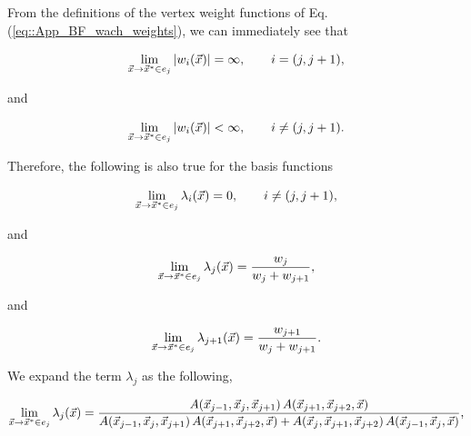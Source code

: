 \noindent From the definitions of the vertex weight functions of Eq. (\ref{eq::App_BF_wach_weights}), we can immediately see that 

\begin{equation}
\label{eq::App_BF_wach_edge_lim_jj1}
\lim\displaylimits_{\vec{x} \rightarrow \vec{x}^* \in e_j} | w_i (\vec{x}) |= \infty, \qquad i=(j,j+1) ,
\end{equation} 

\noindent and

\begin{equation}
\label{eq::App_BF_wach_edge_lim_others}
\lim\displaylimits_{\vec{x} \rightarrow \vec{x}^* \in e_j} |  w_i (\vec{x}) | < \infty, \qquad i\neq (j,j+1) .
\end{equation} 

\noindent Therefore, the following is also true for the basis functions

\begin{equation}
\label{eq::App_BF_wach_edge_lim_bfj}
\lim\displaylimits_{\vec{x} \rightarrow \vec{x}^* \in e_j}  \lambda_i (\vec{x}) = 0, \qquad i\neq(j,j+1),
\end{equation} 

\noindent and

\begin{equation}
\label{eq::App_BF_wach_edge_lim_bfj}
\lim\displaylimits_{\vec{x} \rightarrow \vec{x}^* \in e_j}  \lambda_{j} (\vec{x}) = \frac{w_j}{w_j + w_{j+1}}, 
\end{equation} 

\noindent and

\begin{equation}
\label{eq::App_BF_wach_edge_lim_bfj1}
\lim\displaylimits_{\vec{x} \rightarrow \vec{x}^* \in e_j}  \lambda_{j+1} (\vec{x}) = \frac{w_{j+1}}{w_j + w_{j+1}}.
\end{equation} 

\noindent We expand the term $\lambda_j$ as the following,

\begin{equation}
\label{eq::App_BF_wach_edge_lim_lamj_expand}
\lim\displaylimits_{\vec{x} \rightarrow \vec{x}^* \in e_j}  \lambda_{j} (\vec{x}) = \frac{A(\vec{x}_{j-1}, \vec{x}_{j}, \vec{x}_{j+1}) \, A(\vec{x}_{j+1}, \vec{x}_{j+2}, \vec{x})}{A(\vec{x}_{j-1}, \vec{x}_{j}, \vec{x}_{j+1}) \, A(\vec{x}_{j+1}, \vec{x}_{j+2}, \vec{x}) + A(\vec{x}_{j}, \vec{x}_{j+1}, \vec{x}_{j+2}) \, A(\vec{x}_{j-1}, \vec{x}_{j}, \vec{x})},
\end{equation} 

